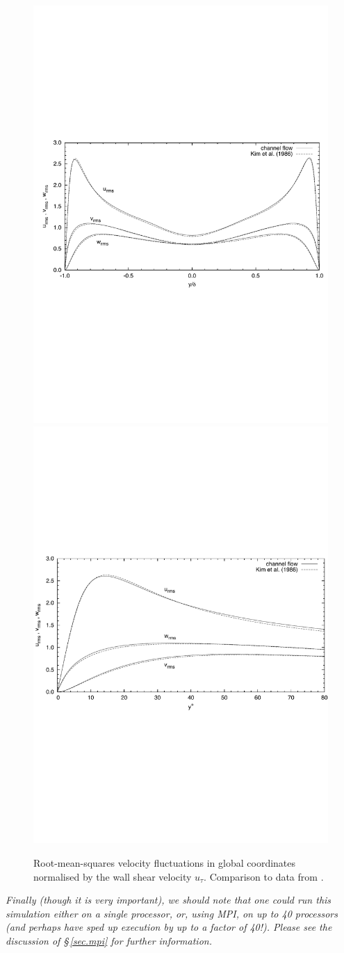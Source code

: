 \documentclass[11pt]{report}
\begin{document}
\begin{figure}
\begin{center}
\includegraphics[height=0.27\linewidth]{dns_rms_global}\\
\includegraphics[height=0.27\linewidth]{dns_rms_wall}
\end{center}
\caption{ Root-mean-squares velocity fluctuations in global
  coordinates normalised by the wall shear velocity
  $u_{\tau}$. Comparison to data from \citet{kmm87}.}
\label{pic:rms_global}
\end{figure}

\emph{Finally (though it is very important), we should note that one
could run this simulation either on a single processor, or, using MPI,
on up to 40 processors (and perhaps have sped up execution by up to a
factor of 40!).  Please see the discussion of \S\,\ref{sec.mpi} for
further information.}


\clearpage
{}



\end{document}
